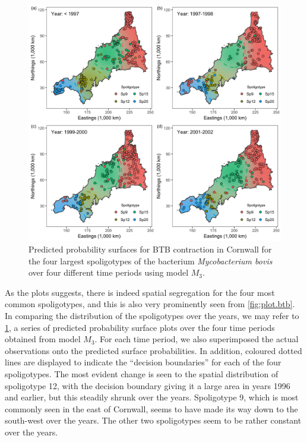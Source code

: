 \documentclass[showframe,11pt]{report}\usepackage[]{graphicx}\usepackage{xcolor}
\newenvironment{knitrout}{}{} %
\begin{document}
\begin{knitrout}
\color{fgcolor}\begin{figure}[p]

{\centering \includegraphics[width=\linewidth]{figure/05-plot_temporal_btb-1} 

}

\caption[Predicted probability surfaces of BTB contraction using model $M_3$]{Predicted probability surfaces for BTB contraction in Cornwall for the four largest spoligotypes of the bacterium \emph{Mycobacterium bovis} over four different time periods using model $M_3$.}\label{fig:plot.temporal.btb}
\end{figure}


\end{knitrout}

As the plots suggests, there is indeed spatial segregation for the four most common spoligotypes, and this is also very prominently seen from \cref{fig:plot.btb}.
In comparing the distribution of the spoligotypes over the years, we may refer to \cref{fig:plot.temporal.btb}, a series of predicted probability surface plots over the four time periods obtained from model $M_3$.
For each time period, we also superimposed the actual observations onto the predicted surface probabilities.
In addition, coloured dotted lines are displayed to indicate the ``decision boundaries'' for each of the four spoligotypes.
The most evident change is seen to the spatial distribution of spoligotype 12, with the decision boundary giving it a large area in years 1996 and earlier, but this steadily shrunk over the years.
Spoligotype 9, which is most commonly seen in the east of Cornwall, seems to have made its way down to the south-west over the years.
The other two spoligotypes seem to be rather constant over the years.
\end{document}
